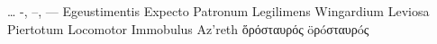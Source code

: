 …
-, –, —
Egeustimentis
Expecto Patronum
Legilimens
Wingardium Leviosa
Piertotum Locomotor
Immobulus
Az’reth
ὅρόσταυρός	öρóσταυρóς